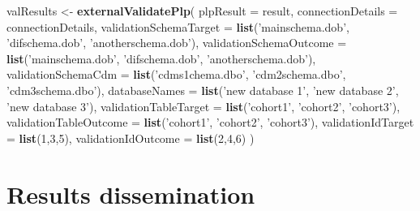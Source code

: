 \documentclass[11pt]{book}
\newenvironment{Shaded}{\begin{snugshade}}{\end{snugshade}}
\newcommand{\DataTypeTok}[1]{\textcolor[rgb]{0.13,0.29,0.53}{#1}}
\newcommand{\DecValTok}[1]{\textcolor[rgb]{0.00,0.00,0.81}{#1}}
\newcommand{\KeywordTok}[1]{\textcolor[rgb]{0.13,0.29,0.53}{\textbf{#1}}}
\newcommand{\NormalTok}[1]{#1}
\newcommand{\StringTok}[1]{\textcolor[rgb]{0.31,0.60,0.02}{#1}}
\theoremstyle{definition}
\theoremstyle{definition}
\theoremstyle{definition}
\theoremstyle{remark}
\begin{document}
\begin{Shaded}
\begin{Highlighting}[]
\NormalTok{valResults <-}\StringTok{ }\KeywordTok{externalValidatePlp}\NormalTok{(}
    \DataTypeTok{plpResult =}\NormalTok{ result, }
    \DataTypeTok{connectionDetails =}\NormalTok{ connectionDetails,}
    \DataTypeTok{validationSchemaTarget =} \KeywordTok{list}\NormalTok{(}\StringTok{'mainschema.dob'}\NormalTok{,}
                                \StringTok{'difschema.dob'}\NormalTok{, }
                                \StringTok{'anotherschema.dob'}\NormalTok{),}
    \DataTypeTok{validationSchemaOutcome =} \KeywordTok{list}\NormalTok{(}\StringTok{'mainschema.dob'}\NormalTok{,}
                                 \StringTok{'difschema.dob'}\NormalTok{, }
                                 \StringTok{'anotherschema.dob'}\NormalTok{),}
    \DataTypeTok{validationSchemaCdm =} \KeywordTok{list}\NormalTok{(}\StringTok{'cdms1chema.dbo'}\NormalTok{,}
                             \StringTok{'cdm2schema.dbo'}\NormalTok{,}
                             \StringTok{'cdm3schema.dbo'}\NormalTok{),}
    \DataTypeTok{databaseNames =} \KeywordTok{list}\NormalTok{(}\StringTok{'new database 1'}\NormalTok{,}
                       \StringTok{'new database 2'}\NormalTok{,}
                       \StringTok{'new database 3'}\NormalTok{),}
    \DataTypeTok{validationTableTarget =} \KeywordTok{list}\NormalTok{(}\StringTok{'cohort1'}\NormalTok{,}
                               \StringTok{'cohort2'}\NormalTok{,}
                               \StringTok{'cohort3'}\NormalTok{),}
    \DataTypeTok{validationTableOutcome =} \KeywordTok{list}\NormalTok{(}\StringTok{'cohort1'}\NormalTok{,}
                                \StringTok{'cohort2'}\NormalTok{,}
                                \StringTok{'cohort3'}\NormalTok{),}
    \DataTypeTok{validationIdTarget =} \KeywordTok{list}\NormalTok{(}\DecValTok{1}\NormalTok{,}\DecValTok{3}\NormalTok{,}\DecValTok{5}\NormalTok{),}
    \DataTypeTok{validationIdOutcome =} \KeywordTok{list}\NormalTok{(}\DecValTok{2}\NormalTok{,}\DecValTok{4}\NormalTok{,}\DecValTok{6}\NormalTok{)}
\NormalTok{)}
\end{Highlighting}
\end{Shaded}

\hypertarget{results-dissemination}{%
\section{Results dissemination}\label{results-dissemination}}
\end{document}
